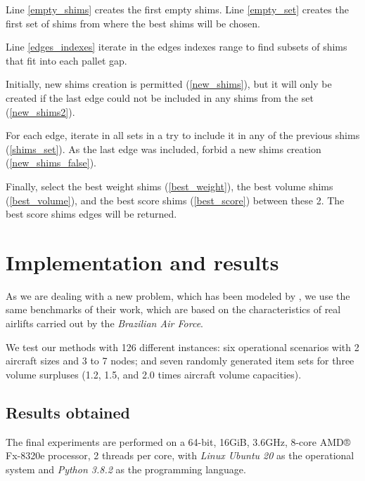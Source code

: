 \documentclass[preprint,authoryear]{elsarticle}
\begin{document}
Line \ref{empty_shims} creates the first empty shims.
Line \ref{empty_set} creates the first set of shims from where the best shims will be chosen.

Line \ref{edges_indexes} iterate in the edges indexes range to find subsets of shims that fit into each pallet gap.

Initially, new shims creation is permitted (\ref{new_shims}), but it will only be created if the last edge could not be included in any shims from the set (\ref{new_shims2}). 

For each edge, iterate in all sets in a try to include it in any of the previous shims (\ref{shims_set}).
As the last edge was included, forbid a new shims creation (\ref{new_shims_false}).

Finally, select the best weight shims (\ref{best_weight}), the best volume shims (\ref{best_volume}), and the best score shims (\ref{best_score}) between these 2. The best score shims edges will be returned.



\section{Implementation and results}
\label{sec6}


As we are dealing with a new problem, which has been modeled by \cite{MesquitaSanches2023}, we use the same benchmarks of their work, which are based on the characteristics of real airlifts carried out by the {\em Brazilian Air Force}.
 
We test our methods with 126 different instances: six operational scenarios with 2 aircraft sizes and 3 to 7 nodes; and seven randomly generated item sets for three volume surpluses (1.2, 1.5, and 2.0 times aircraft volume capacities).


\subsection{Results obtained}




The final experiments are performed on a 64-bit, 16GiB, 3.6GHz, 8-core AMD® Fx-8320e processor, 2 threads per core, with {\it Linux Ubuntu 20} as the operational system and {\it Python 3.8.2} as the programming language.
\end{document}
